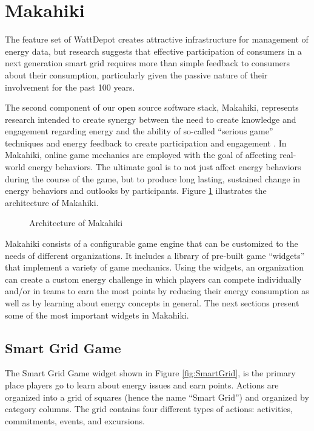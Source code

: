 \section{Makahiki}
The feature set of WattDepot creates attractive infrastructure for management of energy data, but research suggests that effective participation of consumers in a next generation smart grid requires more than simple feedback to consumers about their consumption, particularly given the passive nature of their involvement for the past 100 years.

The second component of our open source software stack, Makahiki, represents research intended to create synergy between the need to create knowledge and engagement regarding energy and the ability of so-called ``serious game'' techniques and energy feedback to create participation and engagement \cite{Deterding2011mt,darby-review-2006,Faruqui09,petersen-dorm-energy-reduction}. In Makahiki, online game mechanics are employed with the goal of affecting real-world energy behaviors.  The ultimate goal is to not just affect energy behaviors during the course of the game, but to produce long lasting, sustained change in energy behaviors and outlooks by participants. Figure \ref{fig:makahiki-architecture} illustrates the architecture of Makahiki.

\begin{figure}
\begin{center}
\end{center}
\caption{Architecture of Makahiki}
\label{fig:makahiki-architecture}
\end{figure}

Makahiki consists of a configurable game engine that can be customized to the needs of different organizations.  It includes a library of pre-built game ``widgets'' that implement a variety of game mechanics.  Using the widgets, an organization can create a custom energy challenge in which players can compete individually and/or in teams to earn the most points by reducing their energy consumption as well as by learning about energy concepts in general.  The next sections present some of the most important widgets in Makahiki.

\bigskip
\subsection{Smart Grid Game}

The Smart Grid Game widget shown in Figure \ref{fig:SmartGrid}, is the primary place players go to learn about energy issues and earn points. Actions are organized into a grid of squares (hence the name ``Smart Grid'') and organized by category columns. The grid contains four different types of actions: activities, commitments, events, and excursions.

